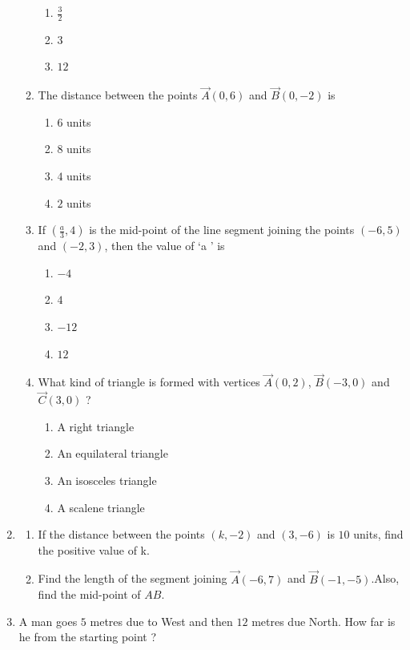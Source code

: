 \begin{enumerate}[label=\thesubsection.\arabic*.,ref=\thesubsection.\theenumi]
\begin{enumerate}[label=(\roman*)]
\begin{enumerate}[label=(\Alph*)]
				     \item $\frac{3}{2}$
				     \item $3$
				     \item $12$
			     \end{enumerate}
		    \item The distance between the points $\vec{A}(0, 6)$ and $\vec{B}(0, -2)$ is 
			    \begin{enumerate}[label=(\Alph*)]
				    \item $6$ units
				    \item $8$ units
				    \item $4$ units
				    \item $2$ units
				    \end{enumerate}
		    \item If $(\frac{a}{3},4)$ is the mid-point of the line segment joining the points $(-6, 5)$ and $(-2, 3)$, then the value of \lq a \rq{} is
		    \begin{enumerate}[label=(\Alph*)]
				    \item $-4$
				    \item $4$
				    \item $-12$
				    \item $12$
			    \end{enumerate}
		    \item What kind of triangle is formed with vertices $\vec{A}(0, 2)$, $\vec{B}(-3, 0)$ and $\vec{C}(3, 0)$ ?
			    \begin{enumerate}[label=(\Alph*)]
				    \item A right triangle
				    \item An equilateral triangle
				    \item An isosceles triangle
				    \item A scalene triangle
			    \end{enumerate}
	     \end{enumerate}
     \item \begin{enumerate}[label=(\alph*)]
		     \item If the distance between the points $(k, -2)$ and $(3, -6)$ is $10$ units, find the positive value of k.
		     \item Find the length of the segment joining $\vec{A}(-6, 7)$ and $\vec{B}(-1, -5)$.Also, find the mid-point of $AB$. 
     \end{enumerate}
     \item A man goes $5$ metres due to West and then $12$ metres due North. How far is he from the starting point ?

\end{enumerate}
